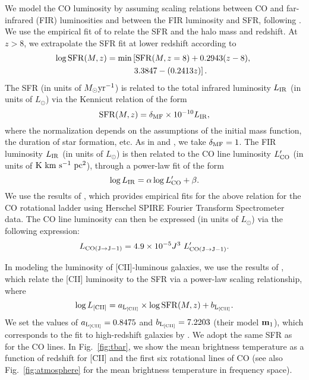 \documentclass[twocolumn]{aastex631}
\newcommand{\be}{\begin{equation}}
\newcommand{\ee}{\end{equation}}
\begin{document}
We model the CO luminosity by assuming scaling relations between CO and far-infrared (FIR) luminosities and between the FIR luminosity and SFR, following  \cite{Li:2015gqa}. We use the empirical fit of \cite{Behroozi:2012sp} to relate the SFR and the halo mass and redshift. At $z>8$, we extrapolate the SFR fit at lower redshift according to 
\begin{align}\label{eq:SFR_extrap}
\log  {\rm SFR}(M,z) = {\rm min}&\left[{\rm SFR}(M,z=8) + 0.2943(z-8), \right. \nonumber \\
					&\left. 3.3847-(0.2413z)\right].
\end{align}
The SFR (in units of $M_\odot {\rm yr}^{-1}$) is related to the total infrared luminosity $L_{\rm IR}$ (in units of $L_\odot$) via the Kennicut relation  \citep{Kennicutt:1998zb} of the form
\begin{equation}
{\rm SFR}(M,z) = \delta_{\rm MF} \times 10^{-10} L_{\rm IR},
\end{equation}
where the normalization depends on the assumptions of the initial mass function, the duration of star formation, etc. As in \cite{Behroozi:2012sp} and \cite{Li:2015gqa}, we take $\delta_{\rm MF} =1$. The FIR luminosity $L_{\rm IR}$ (in units of $L_\odot$) is then related to the CO line luminosity $L'_{\rm CO}$ (in units of ${\rm K} \ {\rm km} \ {\rm s}^{-1} \ {\rm pc}^2$), through a power-law fit of the form
\begin{equation}\label{eq:CO_lum}
\log L_{\rm IR} = \alpha \log  L'_{\rm CO} + \beta.
\end{equation}
We use the results of \cite{Kamenetzky_2016}, which provides empirical fits for the above relation for the CO rotational ladder using Herschel SPIRE Fourier Transform Spectrometer data. The CO line luminosity can then be expressed (in units of $L_{\odot}$) via the following expression: 
\be
L_{\rm CO(J\rightarrow J-1)} = 4.9 \times 10^{-5} J^3 \ L'_{\rm CO(J\rightarrow J-1)}.
\ee

In modeling the luminosity of [CII]-luminous galaxies, we use the results of \cite{Silva:2014ira}, which relate the [CII] luminosity to the SFR via a power-law scaling relationship, where
\be \label{eq:[CII]_lum}
\log L_{\rm [CII]} = a_{\rm L_{\rm [CII]}} \times \log {\rm SFR}(M,z) +b_{\rm L_{\rm [CII]}}.
\ee
We set the values of $a_{\rm L_{\rm [CII]}}= 0.8475$ and $b_{\rm L_{\rm [CII]}} =  7.2203$ (their model ${\bf m}_1$), which corresponds to the fit to high-redshift galaxies by \cite{DeLooze:2014dta}. We adopt the same SFR as for the CO lines. In Fig.~\ref{fig:tbar}, we show the mean brightness temperature as a function of redshift for [CII] and the first six rotational lines of CO (see also  Fig.~\ref{fig:atmosphere} for the mean brightness temperature in frequency space).
\end{document}

